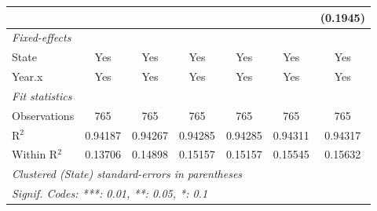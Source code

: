 \begin{tabular}{lcccccc}
                         &                &                &                 &                 &                 & (0.1945)\\   
   \midrule
   \emph{Fixed-effects}\\
   State                 & Yes            & Yes            & Yes             & Yes             & Yes             & Yes\\  
   Year.x                & Yes            & Yes            & Yes             & Yes             & Yes             & Yes\\  
   \midrule
   \emph{Fit statistics}\\
   Observations          & 765            & 765            & 765             & 765             & 765             & 765\\  
   R$^2$                 & 0.94187        & 0.94267        & 0.94285         & 0.94285         & 0.94311         & 0.94317\\  
   Within R$^2$          & 0.13706        & 0.14898        & 0.15157         & 0.15157         & 0.15545         & 0.15632\\  
   \midrule \midrule
   \multicolumn{7}{l}{\emph{Clustered (State) standard-errors in parentheses}}\\
   \multicolumn{7}{l}{\emph{Signif. Codes: ***: 0.01, **: 0.05, *: 0.1}}\\
\end{tabular}
\par\endgroup



